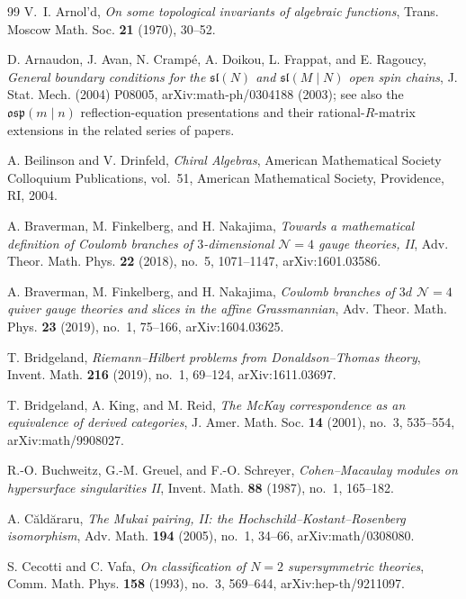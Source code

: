 \begin{thebibliography}{99}
V.~I. Arnol'd, \emph{On some topological invariants of algebraic functions}, Trans. Moscow Math. Soc. \textbf{21} (1970), 30--52.

D. Arnaudon, J. Avan, N. Cramp\'e, A. Doikou, L. Frappat, and E. Ragoucy, \emph{General boundary conditions for the $\mathfrak{sl}(N)$ and $\mathfrak{sl}(M \mid N)$ open spin chains}, J. Stat. Mech. (2004) P08005, arXiv:math-ph/0304188 (2003); see also the $\mathfrak{osp}(m \mid n)$ reflection-equation presentations and their rational-$R$-matrix extensions in the related series of papers.

A. Beilinson and V. Drinfeld, \emph{Chiral Algebras}, American Mathematical Society Colloquium Publications, vol.~51, American Mathematical Society, Providence, RI, 2004.

A. Braverman, M. Finkelberg, and H. Nakajima, \emph{Towards a mathematical definition of Coulomb branches of $3$-dimensional $\mathcal{N} = 4$ gauge theories, II}, Adv. Theor. Math. Phys. \textbf{22} (2018), no.~5, 1071--1147, arXiv:1601.03586.

A. Braverman, M. Finkelberg, and H. Nakajima, \emph{Coulomb branches of $3d$ $\mathcal{N}=4$ quiver gauge theories and slices in the affine Grassmannian}, Adv. Theor. Math. Phys. \textbf{23} (2019), no.~1, 75--166, arXiv:1604.03625.

T. Bridgeland, \emph{Riemann--Hilbert problems from Donaldson--Thomas theory}, Invent. Math. \textbf{216} (2019), no.~1, 69--124, arXiv:1611.03697.

T. Bridgeland, A. King, and M. Reid, \emph{The McKay correspondence as an equivalence of derived categories}, J. Amer. Math. Soc. \textbf{14} (2001), no.~3, 535--554, arXiv:math/9908027.

R.-O. Buchweitz, G.-M. Greuel, and F.-O. Schreyer, \emph{Cohen--Macaulay modules on hypersurface singularities II}, Invent. Math. \textbf{88} (1987), no.~1, 165--182.

A. C{\u a}ld{\u a}raru, \emph{The Mukai pairing, II: the Hochschild--Kostant--Rosenberg isomorphism}, Adv. Math. \textbf{194} (2005), no.~1, 34--66, arXiv:math/0308080.

S. Cecotti and C. Vafa, \emph{On classification of $N=2$ supersymmetric theories}, Comm. Math. Phys. \textbf{158} (1993), no.~3, 569--644, arXiv:hep-th/9211097.


\end{thebibliography}
